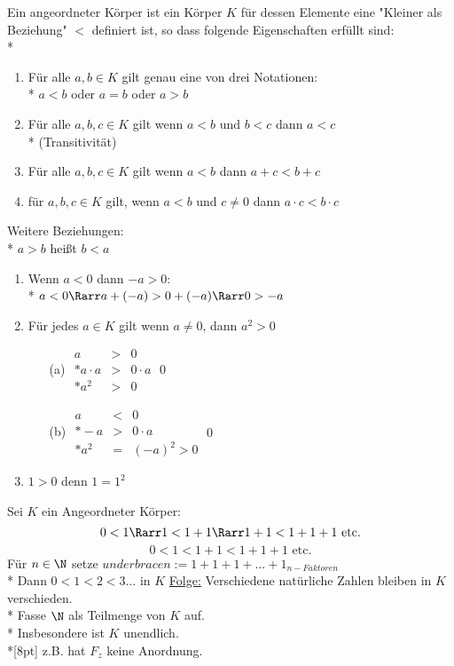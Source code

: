     Ein angeordneter Körper ist ein Körper $K$ für dessen Elemente eine "Kleiner als Beziehung" $<$ definiert ist, so dass folgende Eigenschaften erfüllt sind:\\*
    \begin{enumerate}
    \item{Für alle $a, b \in K$ gilt genau eine von drei Notationen:\\*
    $a < b$ oder $a = b$ oder $a > b$}
    \item{Für alle $a, b, c \in K$ gilt wenn $a < b$ und $b < c$ dann $a < c$\\* (Transitivität)}
    \item{Für alle $a, b, c \in K$ gilt wenn $a < b$ dann $a + c < b + c$}
    \item{für $a, b, c \in K$ gilt, wenn $a < b$ und $c \neq 0$ dann $a \cdot c < b \cdot c$}
    \end{enumerate}
	Weitere Beziehungen:\\*
	$a > b$ heißt $b < a$
	\begin{enumerate}
	\item{Wenn $a < 0$ dann $-a > 0$:\\*
	$a < 0 \Rarr a + (-a) > 0 + (-a) \Rarr 0 > -a$}
	\item{Für jedes $a \in K $ gilt wenn $a \neq 0$, dann $a^2 > 0$
	\begin{itemize}
	\item[(a)]{$\begin{array}{ccc}
	a &>& 0\\*
	a · a &>& 0 · a\\*
	a^2 &>& 0
	\end{array}$\qed}
	\item[(b)]{$\begin{array}{ccc}
		a &<& 0\\*
		-a &>& 0 · a\\*
		a^2 &=& (-a)^2 > 0
		\end{array}$\qed}
	\end{itemize}}
	\item{$1 > 0 $ denn $1 = 1^2$}
	\end{enumerate}
	Sei $K$ ein Angeordneter Körper:
	$$0 < 1 \Rarr 1 < 1 + 1 \Rarr 1 + 1 < 1 + 1 + 1 \text{ etc.}$$
	$$0 < 1 < 1 + 1 < 1 + 1 +1 \text{ etc.}$$
	Für $n \in \N$ setze $underbrace{n:= 1 + 1 + 1 + … + 1}_{n-Faktoren}$\\*
	Dann $0 < 1 < 2 < 3 … $ in $K$
	\ul{Folge:} Verschiedene natürliche Zahlen bleiben in $K$ verschieden.\\*
	Fasse $\N$ als Teilmenge von $K$ auf.\\*
	Insbesondere ist $K$ unendlich.\\*[8pt]
	z.B. hat $F_z$ keine Anordnung.

